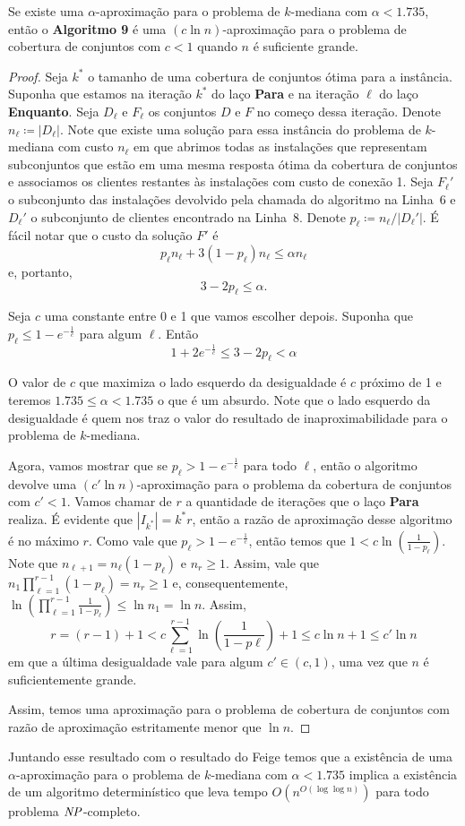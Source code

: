 \begin{theorem}
Se existe uma $\alpha$-aproximação para o problema de $k$-mediana com $\alpha < 1.735$, então o {\bf Algoritmo 9} é uma $(c \ln n)$-aproximação para o problema de cobertura de conjuntos com $c<1$ quando $n$ é suficiente grande.
\end{theorem}

\begin{proof}
Seja $k^*$ o tamanho de uma cobertura de conjuntos ótima para a instância. Suponha que estamos na iteração $k^*$ do laço {\bf Para} e na iteração $\ell$ do laço {\bf Enquanto}.
Seja $D_\ell$ e $F_\ell$ os conjuntos $D$ e $F$ no começo dessa iteração. Denote $n_\ell \coloneqq |D_\ell|$. Note que existe uma solução para essa instância do problema de $k$-mediana com custo $n_\ell$ em que abrimos todas as instalações que representam subconjuntos que estão em uma mesma resposta ótima da cobertura de conjuntos e associamos os clientes restantes às instalações com custo de conexão 1.
Seja $F_\ell'$ o subconjunto das instalações devolvido pela chamada do algoritmo na Linha~6 e $D_\ell'$ o subconjunto de clientes encontrado na Linha~8. Denote $p_\ell \coloneqq n_\ell / |D_\ell'|$. É fácil notar que o custo da solução $F'$ é
\[ p_\ell n_\ell + 3 (1-p_\ell) n_\ell \leq \alpha  n_\ell\]
e, portanto, 
\begin{equation} 
3 - 2p_\ell \leq \alpha.
\end{equation}

Seja $c$ uma constante entre 0 e 1 que vamos escolher depois. Suponha que $p_\ell \leq 1 - e^{-\frac{1}{c}}$ para algum $\ell$. 
Então
\[ 1 + 2e^{-\frac{1}{c}} \leq 3 - 2p_\ell < \alpha\]

O valor de $c$ que maximiza o lado esquerdo da desigualdade é $c$ próximo de 1 e teremos $1.735 \leq \alpha < 1.735$ o que é um absurdo. Note que o lado esquerdo da desigualdade é quem nos traz o valor do resultado de inaproximabilidade para o problema de $k$-mediana.

Agora, vamos mostrar que se $p_\ell > 1 - e^{ - \frac{1}{c}}$ para todo $\ell$, então o algoritmo devolve uma $(c'\ln n)$-aproximação para o problema da cobertura de conjuntos com $c' < 1$. Vamos chamar de $r$ a quantidade de iterações que o laço {\bf Para} realiza. É evidente que $|I_{k^*}| = k^*r$, então a razão de aproximação desse algoritmo é no máximo $r$. Como vale que $p_\ell > 1 - e^{ - \frac{1}{c}}$, então temos que $1 < c \ln\left( \frac{1}{1-p_\ell}\right)$. Note que $n_{\ell + 1} = n_\ell(1-p_\ell)$ e $n_r \geq 1$. Assim, vale que $n_1 \prod_{\ell =1}^{r-1} (1 - p_\ell) = n_r \geq 1$ e, consequentemente, $\ln\left(\prod_{\ell =1 }^{r-1} \frac{1}{1-p_\ell}\right) \leq \ln n_1 = \ln n$. Assim,
\[
r = (r - 1) + 1 < c\sum_{\ell = 1}^{r-1} \ln \left( \frac{1}{1-p\ell}\right) + 1 \leq c \ln n + 1 \leq c' \ln n
\]
em que a última desigualdade vale para algum $c' \in (c,1)$, uma vez que $n$ é suficientemente grande.

Assim, temos uma aproximação para o problema de cobertura de conjuntos com razão de aproximação estritamente menor que $\ln n$.
\end{proof}

Juntando esse resultado com o resultado do Feige temos que a existência de uma $\alpha$-aproximação para o problema de $k$-mediana com $\alpha < 1.735$ implica a existência de um algoritmo determinístico que leva tempo $O(n^{O(\log \log n)})$ para todo problema $\mathit{NP}$-completo.